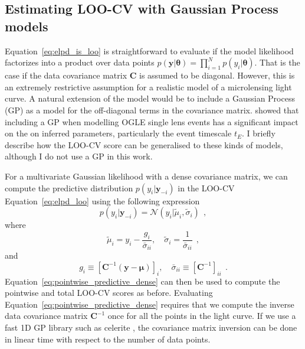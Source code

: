 \documentclass[12pt,dvipsnames]{report}
\newcommand{\ssf}[1]{\textsf{#1}}
\renewcommand{\vec}[1]{\boldsymbol{\mathbf{#1}}}
\newcommand{\hquad}{~~}
\begin{document}
\subsection{Estimating LOO-CV with Gaussian Process models}
\label{ssec:generalising_to_non_seperable_likelihoods}
Equation~\ref{eq:elpd_is_loo} is straightforward to evaluate if the model likelihood 
factorizes into a product over data points 
$p(\vec y|\vec\theta) = \prod_{i=1}^N p(y_i|\vec\theta)$.
That is the case if the data covariance matrix $\vec C$ is assumed to be diagonal.  
However, this is an extremely 
restrictive assumption for a realistic model of a microlensing light curve. 
A natural extension of the model would be to include a Gaussian Process (GP) as a model 
for the off-diagonal terms in the covariance matrix. \citet{golovich2022} showed that 
including a GP when modelling OGLE single lens events has a significant impact on the 
on inferred  parameters, particularly the event timescale $t_E$.  
I briefly describe how the LOO-CV score can be generalised to these kinds of models,
although I do not use a GP in this work. 

For a multivariate Gaussian likelihood with a dense covariance matrix, we can compute 
the predictive distribution $p(y_i|\vec y_{-i})$ in the LOO-CV Equation~\ref{eq:elpd_loo}
using the following expression \citep{arXiv:1810.10559} 
\begin{equation}
    p(y_i|\vec y_{-i}) = \mathcal{N}\left(y_i|\tilde{\mu}_i, \tilde{\sigma}_i\right)
    \hquad,
    \label{eq:pointwise_predictive_dense}
\end{equation}
where 
\begin{equation}
\tilde{\mu}_i=y_i-\frac{g_i}{\bar{\sigma}_{i i}},\quad\tilde{\sigma}_i=\frac{1}{\bar{\sigma}_{i i}}
\hquad,
\end{equation}
and 
\begin{equation}
g_i\equiv\left[{\vec C}^{-1}(\vec y-\vec \mu)\right]_i,
\quad
\bar{\sigma}_{i i}\equiv\left[{\vec C}^{-1}\right]_{i i}
\hquad.
\end{equation}
Equation~\ref{eq:pointwise_predictive_dense} can then be used to compute the pointwise 
and total LOO-CV scores as before.
Evaluating Equation~\ref{eq:pointwise_predictive_dense} requires that we compute 
the inverse data covariance matrix $\vec C^{-1}$ once for all the points in the 
light curve. If we use a fast 1D GP library such as \ssf{celerite} 
\citep{2017AJ....154..220F}, the covariance matrix inversion can be done in linear time 
with respect to the number of data points. 
\end{document}
